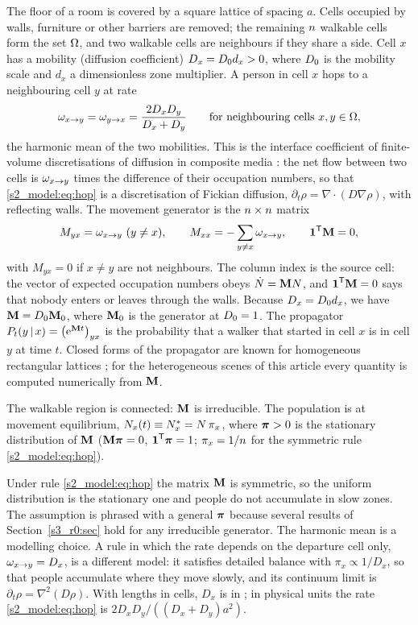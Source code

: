 The floor of a room is covered by a square lattice of spacing $a$. Cells occupied by walls, furniture or other
barriers are removed; the remaining $n$ walkable cells form the set $\Omega$, and two walkable cells are
neighbours if they share a side. Cell $x$ has a mobility (diffusion coefficient) $D_x=D_0 d_x>0$, where $D_0$
is the mobility scale and $d_x$ a dimensionless zone multiplier. A person in cell $x$ hops to a neighbouring
cell $y$ at rate
\begin{equation}\label{s2_model:eq:hop}
  \omega_{x\to y}=\omega_{y\to x}=\frac{2D_xD_y}{D_x+D_y}\qquad\text{for neighbouring cells } x,y\in\Omega ,
\end{equation}
the harmonic mean of the two mobilities. This is the interface coefficient of finite-volume discretisations
of diffusion in composite media \citep{patankar1980numerical}: the net flow between two cells is
$\omega_{x\to y}$ times the difference of their occupation numbers, so that \eqref{s2_model:eq:hop} is a
discretisation of Fickian diffusion, $\partial_t\rho=\nabla\!\cdot(D\nabla\rho)$, with reflecting walls. The
movement generator is the $n\times n$ matrix
\begin{equation}\label{s2_model:eq:generator}
  M_{yx}=\omega_{x\to y}\ (y\neq x),\qquad M_{xx}=-\sum_{y\neq x}\omega_{x\to y},\qquad \boldsymbol{1}^{\mathsf{T}}\mathbf{M}=0 ,
\end{equation}
with $M_{yx}=0$ if $x\ne y$ are not neighbours. The column index is the source cell: the vector of expected
occupation numbers obeys $\dot N=\mathbf{M} N$, and $\boldsymbol{1}^{\mathsf{T}}\mathbf{M}=0$ says that nobody enters or leaves through the
walls. Because $D_x=D_0 d_x$, we have $\mathbf{M}=D_0\mathbf{M}_0$, where $\mathbf{M}_0$ is the generator at $D_0=1$. The
propagator $P_t(y\,|\,x)=\bigl(\mathrm{e}^{\mathbf{M} t}\bigr)_{yx}$ is the probability that a walker that started in cell
$x$ is in cell $y$ at time $t$. Closed forms of the propagator are known for homogeneous rectangular lattices
\citep{giuggioli2020exact}; for the heterogeneous scenes of this article every quantity is computed
numerically from $\mathbf{M}$.

\begin{assumption}\label{s2_model:ass:A}
  The walkable region is connected: $\mathbf{M}$ is irreducible.  The population is at movement equilibrium,
  $N_x(t)\equiv N^*_x=N\,\pi_x$, where $\boldsymbol{\pi}>0$ is the stationary distribution of $\mathbf{M}$
  ($\mathbf{M}\boldsymbol{\pi}=0$, $\boldsymbol{1}^{\mathsf{T}}\boldsymbol{\pi}=1$; $\pi_x=1/n$ for the symmetric rule \eqref{s2_model:eq:hop}).
\end{assumption}

Under rule \eqref{s2_model:eq:hop} the matrix $\mathbf{M}$ is symmetric, so the uniform distribution is the
stationary one and people do not accumulate in slow zones. The assumption is phrased with a general $\boldsymbol{\pi}$
because several results of Section~\ref{s3_r0:sec} hold for any irreducible generator. The harmonic mean is a
modelling choice. A rule in which the rate depends on the departure cell only, $\omega_{x\to y}=D_x$, is a different
model: it satisfies detailed balance with $\pi_x\propto1/D_x$, so that people accumulate where they move
slowly, and its continuum limit is $\partial_t\rho=\nabla^2(D\rho)$. With lengths in cells, $D_x$ is in
\cdunit{}; in physical units the rate \eqref{s2_model:eq:hop} is $2D_xD_y/((D_x+D_y)a^2)$.


